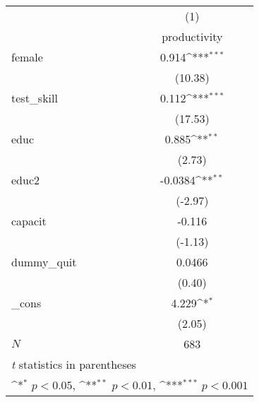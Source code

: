 {
\def\sym#1{\ifmmode^{#1}\else\(^{#1}\)\fi}
\begin{tabular}{l*{1}{c}}
\hline\hline
            &\multicolumn{1}{c}{(1)}\\
            &\multicolumn{1}{c}{productivity}\\
\hline
female      &       0.914\sym{***}\\
            &     (10.38)         \\
[1em]
test\_skill  &       0.112\sym{***}\\
            &     (17.53)         \\
[1em]
educ        &       0.885\sym{**} \\
            &      (2.73)         \\
[1em]
educ2       &     -0.0384\sym{**} \\
            &     (-2.97)         \\
[1em]
capacit     &      -0.116         \\
            &     (-1.13)         \\
[1em]
dummy\_quit  &      0.0466         \\
            &      (0.40)         \\
[1em]
\_cons      &       4.229\sym{*}  \\
            &      (2.05)         \\
\hline
\(N\)       &         683         \\
\hline\hline
\multicolumn{2}{l}{\footnotesize \textit{t} statistics in parentheses}\\
\multicolumn{2}{l}{\footnotesize \sym{*} \(p<0.05\), \sym{**} \(p<0.01\), \sym{***} \(p<0.001\)}\\
\end{tabular}
}
